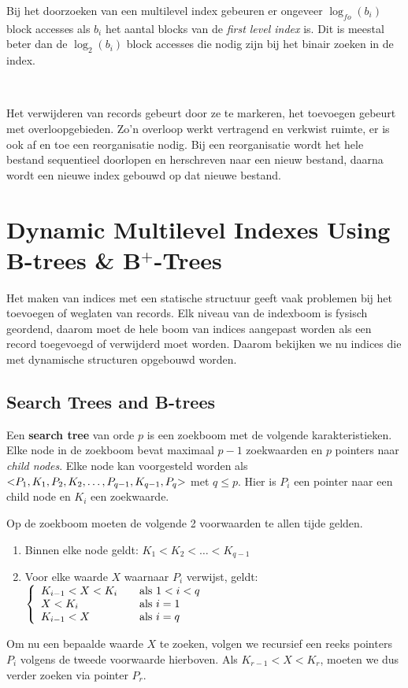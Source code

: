 Bij het doorzoeken van een multilevel index gebeuren er ongeveer $\log_\textit{fo} (b_i)$ block accesses als $b_i$ het aantal blocks van de \textit{first level index} is. Dit is meestal beter dan de $\log_2 (b_i)$ block accesses die nodig zijn bij het binair zoeken in de index.

~

\noindent Het verwijderen van records gebeurt door ze te markeren, het toevoegen gebeurt met overloopgebieden. Zo'n overloop werkt vertragend en verkwist ruimte, er is ook af en toe een reorganisatie nodig. Bij een reorganisatie wordt het hele bestand sequentieel doorlopen en herschreven naar een nieuw bestand, daarna wordt een nieuwe index gebouwd op dat nieuwe bestand.



\section[Dynamic Multilevel Indexes Using B-trees \& B+-Trees]{Dynamic Multilevel Indexes Using B-trees \& B$^+$-Trees}
Het maken van indices met een statische structuur geeft vaak problemen bij het toevoegen of weglaten van records. Elk niveau van de indexboom is fysisch geordend, daarom moet de hele boom van indices aangepast worden als een record toegevoegd of verwijderd moet worden. Daarom bekijken we nu indices die met dynamische structuren opgebouwd worden.


\subsection{Search Trees and B-trees}
Een \textbf{search tree} van orde $p$ is een zoekboom met de volgende karakteristieken. Elke node in de zoekboom bevat maximaal $p-1$ zoekwaarden en $p$ pointers naar \textit{child nodes}. Elke node kan voorgesteld worden als $\text{\textless}P_1, K_1, P_2, K_2, \dots ,P_{q-1}, K_{q-1}, P_q\text{\textgreater}$ met $q \leqslant p$. Hier is $P_i$ een pointer naar een child node en $K_i$ een zoekwaarde.

Op de zoekboom moeten de volgende 2 voorwaarden te allen tijde gelden.
\begin{enumerate}
	\item Binnen elke node geldt: $K_1 < K_2 < \dots < K_{q-1}$
	
	\vspace{-3mm}
	\item Voor elke waarde $X$ waarnaar $P_i$ verwijst, geldt: $
	\left\{
		\begin{array}{l l}
			K_{i-1} < X < K_i	& \quad \text{als } 1<i<q\\
			X < K_i				& \quad \text{als }i=1\\
			K_{i-1} < X			& \quad \text{als }i=q\\
		\end{array}
	\right.$
\end{enumerate}\vspace{1mm}
Om nu een bepaalde waarde $X$ te zoeken, volgen we recursief een reeks pointers $P_i$ volgens de tweede voorwaarde hierboven. Als $K_{r-1} < X < K_r$, moeten we dus verder zoeken via pointer $P_r$.

